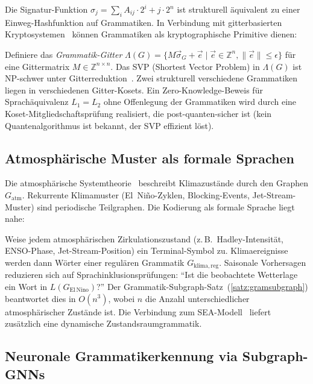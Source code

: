 ﻿\documentclass[a4paper,12pt]{article}
\theoremstyle{definition}
\begin{document}
Die Signatur-Funktion $\sigma_j = \sum_i A_{ij} \cdot 2^i + j \cdot 2^n$
ist strukturell \"aquivalent zu einer Einweg-Hashfunktion auf Grammatiken.
In Verbindung mit gitterbasierten Kryptosystemen~\cite{epp2026lattice}
k\"onnen Grammatiken als kryptographische Primitive dienen:

Definiere das \emph{Grammatik-Gitter}
$\Lambda(G) = \{M \vec{\sigma}_G + \vec{e} \mid \vec{e} \in \mathbb{Z}^n, \|\vec{e}\| \leq \epsilon\}$
f\"ur eine Gittermatrix $M \in \mathbb{Z}^{n \times n}$.
Das SVP (Shortest Vector Problem) in $\Lambda(G)$ ist NP-schwer unter Gitterreduktion~\cite{epp2026lattice}.
Zwei strukturell verschiedene Grammatiken liegen in verschiedenen Gitter-Kosets.
Ein Zero-Knowledge-Beweis f\"ur Sprach\"aquivalenz $L_1 = L_2$ ohne Offenlegung
der Grammatiken wird durch eine Koset-Mitgliedschaftspr\"ufung realisiert,
die post-quanten-sicher ist (kein Quantenalgorithmus ist bekannt, der SVP
effizient l\"ost).

\subsection{Atmosph\"arische Muster als formale Sprachen}

Die atmosph\"arische Systemtheorie~\cite{epp2026klima} beschreibt
Klimazust\"ande durch den Graphen $G_{\mathrm{atm}}$. Rekurrente
Klimamuster (El~Ni\~no-Zyklen, Blocking-Events, Jet-Stream-Muster)
sind periodische Teilgraphen. Die Kodierung als formale Sprache liegt nahe:

Weise jedem atmosph\"arischen Zirkulationszustand (z.\,B.\ Hadley-Intensit\"at,
ENSO-Phase, Jet-Stream-Position) ein Terminal-Symbol zu.
Klimaereignisse werden dann W\"orter einer regul\"aren Grammatik
$G_{\mathrm{klima,reg}}$.
Saisonale Vorhersagen reduzieren sich auf Sprachinklusionspr\"ufungen:
``Ist die beobachtete Wetterlage ein Wort in $L(G_{\mathrm{El\,Nino}})$?''
Der Grammatik-Subgraph-Satz~(\ref{satz:gramsubgraph}) beantwortet dies in $O(n^3)$,
wobei $n$ die Anzahl unterschiedlicher atmosph\"arischer Zust\"ande ist.
Die Verbindung zum SEA-Modell~\cite{epp2026klima} liefert zus\"atzlich eine
dynamische Zustandsraumgrammatik.

\subsection{Neuronale Grammatikerkennung via Subgraph-GNNs}
\end{document}
